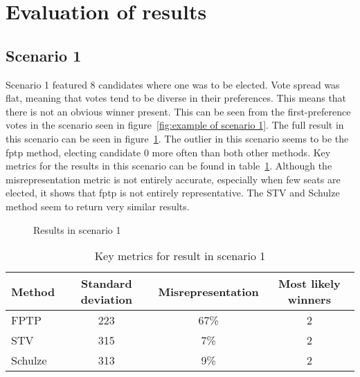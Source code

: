 \documentclass[12pt]{article}
\begin{document}
\section{Evaluation of results}
\subsection{Scenario 1}
Scenario 1 featured 8 candidates where one was to be elected. Vote spread was flat, meaning that votes tend to be diverse in their preferences. This means that there is not an obvious winner present. This can be seen from the first-preference votes in the scenario seen in figure~\ref{fig:example of scenario 1}. The full result in this scenario can be seen in figure~\ref{fig:scenario 1 results}. The outlier in this scenario seems to be the fptp method, electing candidate 0 more often than both other methods. Key metrics for the results in this scenario can be found in table~\ref{tab:scenario 1 result}. Although the misrepresentation metric is not entirely accurate, especially when few seats are elected, it shows that fptp is not entirely representative. The STV and Schulze method seem to return very similar results.
\begin{figure}
	\centering
	\caption{Results in scenario 1}
\label{fig:scenario 1 results}
\end{figure}

\begin{table}
\centering
\caption{Key metrics for result in scenario 1}
\label{tab:scenario 1 result}
\begin{tabular}{@{}lccc@{}}
\toprule
Method & Standard deviation & Misrepresentation & Most likely winners \\ \midrule
FPTP & 223 & 67\% & 2 \\
STV & 315 & 7\% & 2 \\
Schulze & 313 & 9\% & 2 \\ \bottomrule
\end{tabular}
\end{table}
\end{document}
